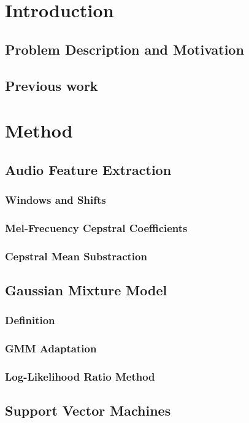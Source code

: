 \documentclass[11pt,a4paper]{tesis}
\begin{document}
\linespread{1.6}
\tableofcontents
\chapter{Introduction}
	\section{Problem Description and Motivation}
	\section{Previous work}
		
\chapter{Method}
	
	\section{Audio Feature Extraction}
		\subsection{Windows and Shifts}
		\subsection{Mel-Frecuency Cepstral Coefficients}
			
		\subsection{Cepstral Mean Substraction}
	\section{Gaussian Mixture Model}
		\subsection{Definition}
		\subsection{GMM Adaptation}
		\subsection{Log-Likelihood Ratio Method}
	\section{Support Vector Machines}
		
\end{document}
